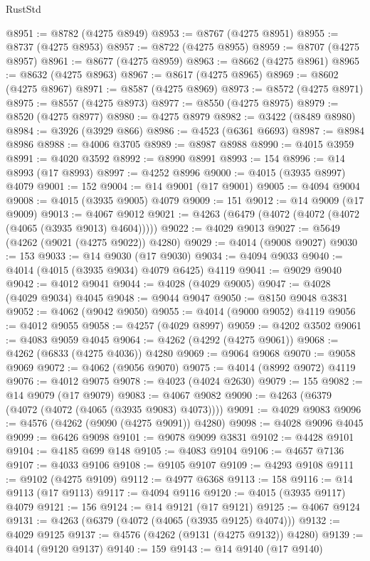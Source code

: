 \begin{lexlean}{RustStd}
\begin{coremodule}
@8951 := @8782 (@4275 @8949)
@8953 := @8767 (@4275 @8951)
@8955 := @8737 (@4275 @8953)
@8957 := @8722 (@4275 @8955)
@8959 := @8707 (@4275 @8957)
@8961 := @8677 (@4275 @8959)
@8963 := @8662 (@4275 @8961)
@8965 := @8632 (@4275 @8963)
@8967 := @8617 (@4275 @8965)
@8969 := @8602 (@4275 @8967)
@8971 := @8587 (@4275 @8969)
@8973 := @8572 (@4275 @8971)
@8975 := @8557 (@4275 @8973)
@8977 := @8550 (@4275 @8975)
@8979 := @8520 (@4275 @8977)
@8980 := @4275 @8979
@8982 := @3422 (@8489 @8980)
@8984 := @3926 (@3929 @866)
@8986 := @4523 (@6361 @6693)
@8987 := @8984 @8986
@8988 := @4006 @3705
@8989 := @8987 @8988
@8990 := @4015 @3959
@8991 := @4020 @3592
@8992 := @8990 @8991
@8993 := 154
@8996 := @14 @8993 (@17 @8993)
@8997 := @4252 @8996
@9000 := @4015 (@3935 @8997) @4079
@9001 := 152
@9004 := @14 @9001 (@17 @9001)
@9005 := @4094 @9004
@9008 := @4015 (@3935 @9005) @4079
@9009 := 151
@9012 := @14 @9009 (@17 @9009)
@9013 := @4067 @9012
@9021 := @4263 (@6479 (@4072 (@4072 (@4072 (@4065 (@3935 @9013) @4604)))))
@9022 := @4029 @9013
@9027 := @5649 (@4262 (@9021 (@4275 @9022)) @4280)
@9029 := @4014 (@9008 @9027)
@9030 := 153
@9033 := @14 @9030 (@17 @9030)
@9034 := @4094 @9033
@9040 := @4014 (@4015 (@3935 @9034) @4079 @6425) @4119
@9041 := @9029 @9040
@9042 := @4012 @9041
@9044 := @4028 (@4029 @9005)
@9047 := @4028 (@4029 @9034) @4045
@9048 := @9044 @9047
@9050 := @8150 @9048 @3831
@9052 := @4062 (@9042 @9050)
@9055 := @4014 (@9000 @9052) @4119
@9056 := @4012 @9055
@9058 := @4257 (@4029 @8997)
@9059 := @4202 @3502
@9061 := @4083 @9059 @4045
@9064 := @4262 (@4292 (@4275 @9061))
@9068 := @4262 (@6833 (@4275 @4036)) @4280
@9069 := @9064 @9068
@9070 := @9058 @9069
@9072 := @4062 (@9056 @9070)
@9075 := @4014 (@8992 @9072) @4119
@9076 := @4012 @9075
@9078 := @4023 (@4024 @2630)
@9079 := 155
@9082 := @14 @9079 (@17 @9079)
@9083 := @4067 @9082
@9090 := @4263 (@6379 (@4072 (@4072 (@4065 (@3935 @9083) @4073))))
@9091 := @4029 @9083
@9096 := @4576 (@4262 (@9090 (@4275 @9091)) @4280)
@9098 := @4028 @9096 @4045
@9099 := @6426 @9098
@9101 := @9078 @9099 @3831
@9102 := @4428 @9101
@9104 := @4185 @699 @148
@9105 := @4083 @9104
@9106 := @4657 @7136
@9107 := @4033 @9106
@9108 := @9105 @9107
@9109 := @4293 @9108
@9111 := @9102 (@4275 @9109)
@9112 := @4977 @6368
@9113 := 158
@9116 := @14 @9113 (@17 @9113)
@9117 := @4094 @9116
@9120 := @4015 (@3935 @9117) @4079
@9121 := 156
@9124 := @14 @9121 (@17 @9121)
@9125 := @4067 @9124
@9131 := @4263 (@6379 (@4072 (@4065 (@3935 @9125) @4074)))
@9132 := @4029 @9125
@9137 := @4576 (@4262 (@9131 (@4275 @9132)) @4280)
@9139 := @4014 (@9120 @9137)
@9140 := 159
@9143 := @14 @9140 (@17 @9140)

\end{coremodule}
\end{lexlean}
